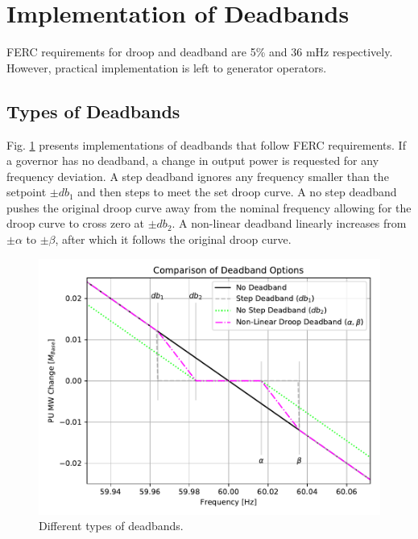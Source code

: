 \section{Implementation of Deadbands}
FERC requirements for droop and deadband are 5\% and 36 mHz respectively\cite{ferc2018}.
However, practical implementation is left to generator operators.

\subsection{Types of Deadbands}
Fig. \ref{fig: deadbandType} presents implementations of deadbands that follow FERC requirements.
If a governor has no deadband, a change in output power is requested for any frequency deviation.
A step deadband ignores any frequency smaller than the setpoint $\pm db_1$ and then steps to meet the set droop curve.
A no step deadband pushes the original droop curve away from the nominal frequency allowing for the droop curve to cross zero at $\pm db_2$.
A non-linear deadband linearly increases from $\pm \alpha$ to $\pm \beta$, after which it follows the original droop curve.
\begin{figure}[!ht]
	\centering
	\includegraphics[width=\linewidth]{figures/dbAction3}
	\caption{Different types of deadbands.}
	\label{fig: deadbandType}
\end{figure}